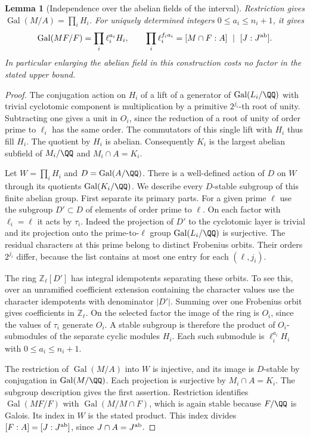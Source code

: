 \documentclass[a4paper,11pt]{article}
\newtheorem{lemma}[proposition]{Lemma}
\theoremstyle{definition}
\theoremstyle{remark}
\newcommand{\ZZ}{\mathbb Z}\newcommand{\ord}{\operatorname{ord}}
\numberwithin{equation}{section}
\begin{document}
\begin{lemma}[Independence over the abelian fields of the interval]\leavevmode
\label{lem:classdisjoint503}
Restriction gives \(\operatorname{Gal}(M/A)=\prod_i H_i\).
For uniquely determined integers \(0\le a_i\le n_i+1\), it gives
\[
 \operatorname{Gal}(MF/F)=\prod_i\ell_i^{a_i}H_i,\qquad
 \prod_i\ell_i^{f_i a_i}=[M\cap F:A]\ \mid\ [J:J^{\rm ab}].
\]
In particular enlarging the abelian field in this construction
costs no factor in the stated upper bound.
\end{lemma}
\begin{proof}
The conjugation action on \(H_i\) of a lift of a generator of
\(\operatorname{Gal}(L_i/\QQ)\) with trivial cyclotomic component
is multiplication by a primitive \(2^{j_i}\)-th root of unity.
Subtracting one gives a unit in \(O_i\), since the reduction of
a root of unity of order prime to \(\ell_i\) has the same order.
The commutators of this single lift with \(H_i\) thus fill \(H_i\).
The quotient by \(H_i\) is abelian. Consequently \(K_i\) is the
largest abelian subfield of \(M_i/\QQ\) and \(M_i\cap A=K_i\).

Let \(W=\prod_i H_i\) and \(D=\operatorname{Gal}(A/\QQ)\).
There is a well-defined action of \(D\) on \(W\) through its
quotients \(\operatorname{Gal}(K_i/\QQ)\). We describe every
\(D\)-stable subgroup of this finite abelian group. First
separate its primary parts. For a given prime \(\ell\) use the
subgroup \(D'\subset D\) of elements of order prime to \(\ell\).
On each factor with \(\ell_i=\ell\) it acts by \(\tau_i\).
Indeed the projection of \(D'\) to the cyclotomic layer is
trivial and its projection onto the prime-to-\(\ell\) group
\(\operatorname{Gal}(L_i/\QQ)\) is surjective. The residual
characters at this prime belong to distinct Frobenius orbits.
Their orders \(2^{j_i}\) differ, because the list contains at
most one entry for each \((\ell,j_i)\).

The ring \(\ZZ_\ell[D']\) has integral idempotents separating
these orbits. To see this, over an unramified coefficient
extension containing the character values use the character
idempotents with denominator \(|D'|\). Summing over one
Frobenius orbit gives coefficients in \(\ZZ_\ell\). On the
selected factor the image of the ring is \(O_i\), since the
values of \(\tau_i\) generate \(O_i\). A stable subgroup is
therefore the product of \(O_i\)-submodules of the separate
cyclic modules \(H_i\). Each such submodule is
\(\ell_i^{a_i}H_i\) with \(0\le a_i\le n_i+1\).

The restriction of \(\operatorname{Gal}(M/A)\) into \(W\) is
injective, and its image is \(D\)-stable by conjugation in
\(\operatorname{Gal}(M/\QQ)\). Each projection is surjective by
\(M_i\cap A=K_i\). The subgroup description gives the first
assertion. Restriction identifies \(\operatorname{Gal}(MF/F)\)
with \(\operatorname{Gal}(M/M\cap F)\), which is again stable
because \(F/\QQ\) is Galois. Its index in \(W\) is the stated
product. This index divides \([F:A]=[J:J^{\rm ab}]\), since
\(J\cap A=J^{\rm ab}\).
\end{proof}
\end{document}
